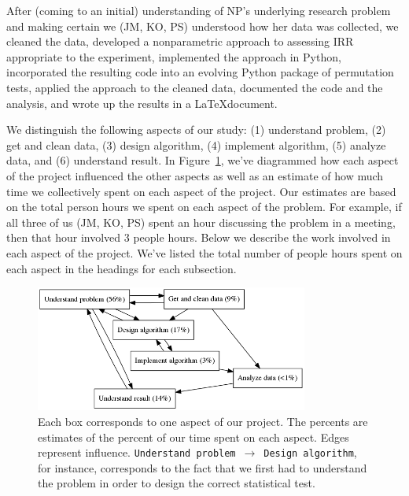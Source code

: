 \documentclass[]{article}
\begin{document}
After (coming to an initial) understanding of NP's underlying research problem
and making certain we (JM, KO, PS) understood how her data was collected, we
cleaned the data, developed a nonparametric approach to assessing IRR
appropriate to the experiment, implemented the approach in Python, incorporated
the resulting code into an evolving Python package of permutation tests,
applied the approach to the cleaned data, documented the code and the analysis,
and wrote up the results in a \LaTeX document. 

We distinguish the following aspects of our study:
(1) understand problem,
(2) get and clean data,
(3) design algorithm,
(4) implement algorithm,
(5) analyze data, and
(6) understand result.
In Figure~\ref{fig:work_process}, we've diagrammed how each aspect of the
project influenced the other aspects as well as an estimate of how much time
we collectively spent on each aspect of the project.
Our estimates are based on the total person hours we spent on each aspect of
the problem.
For example, if all three of us (JM, KO, PS) spent an hour discussing the
problem in a meeting, then that hour involved 3 people hours.
Below we describe the work involved in each aspect of the project.
We've listed the total number of people hours spent on each aspect in the
headings for each subsection.

\begin{figure}[h]
  \centering
    \includegraphics[width=0.8\textwidth]{fig/work_process.png}
  \caption{
  \small
    Each box corresponds to one aspect of our project.
    The percents are estimates of the percent of our time spent on each aspect.
    Edges represent influence.
    \texttt{Understand problem}~$\to$~\texttt{Design algorithm}, for instance,
    corresponds to the fact that we first had to understand the problem
    in order to design the correct statistical test.\label{fig:work_process}}
\end{figure}
\end{document}
